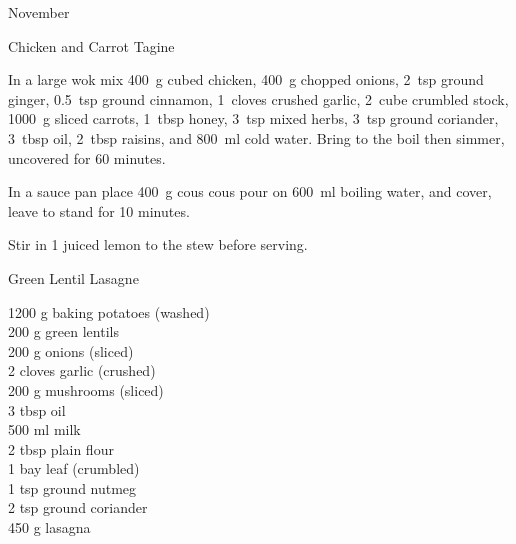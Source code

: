 \begin{menu}{November}
\begin{recipe}{2}{Chicken and Carrot Tagine}
    \begin{instructions}
    \item 
        In a large wok mix
        400~g cubed chicken,
        400~g chopped onions,
        2~tsp  ground ginger,
        0.5~tsp  ground cinnamon,
        1~cloves crushed garlic,
        2~cube crumbled stock,
        1000~g sliced carrots,
        1~tbsp  honey,
        3~tsp  mixed herbs,
        3~tsp  ground coriander,
        3~tbsp  oil,
        2~tbsp  raisins,
        and
        800~ml  cold water.
        Bring to the boil
        then simmer, uncovered for 60 minutes.
      \item 
    In a
    sauce pan 
    place
    400~g  cous cous
    pour on
    600~ml  boiling water,
    and cover, leave to stand for 10 minutes.
  \item 
        Stir in
        1 juiced lemon
        to the stew
        before serving.
      
    \end{instructions}
    \end{recipe}%
  
    \begin{recipe}{2}{Green Lentil Lasagne}%
		\begin{ingredients}
		1200 g baking potatoes (washed) \\
	200 g green lentils  \\
	200 g onions (sliced) \\
	2 cloves garlic (crushed) \\
	200 g mushrooms (sliced) \\
	3 tbsp oil  \\
	500 ml milk  \\
	2 tbsp plain flour  \\
	1  bay leaf (crumbled) \\
	1 tsp ground nutmeg  \\
	2 tsp ground coriander  \\
	450 g lasagna  \\
	
		\end{ingredients}
	
	

\end{recipe}
\end{menu}
